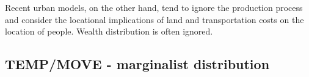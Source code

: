 




Recent urban models, on the other hand, tend to ignore the production process and consider the locational implications of land and transportation costs on the location of people. Wealth distribution is often ignored. 




\subsection{TEMP/MOVE - marginalist distribution}

